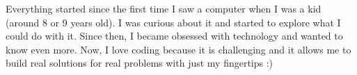 

\blindtext[1]
Everything started since the first time I saw a computer when I was a kid (around 8 or 9 years old). 
I was curious about it and started to explore what I could do with it. Since then, 
I became obsessed with technology and wanted to know even more.
Now, I love coding because it is challenging and it allows me to build real solutions 
for real problems with just my fingertips :)
